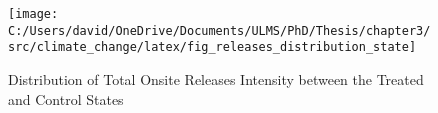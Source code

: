 \begin{figure}[H]
    \centering
    \texttt{[image: C:/Users/david/OneDrive/Documents/ULMS/PhD/Thesis/chapter3/src/climate\_change/latex/fig\_releases\_distribution\_state]}
    \caption{Distribution of Total Onsite Releases Intensity between the Treated and Control States}
    \label{fig:releases-distribution-states}
\end{figure}